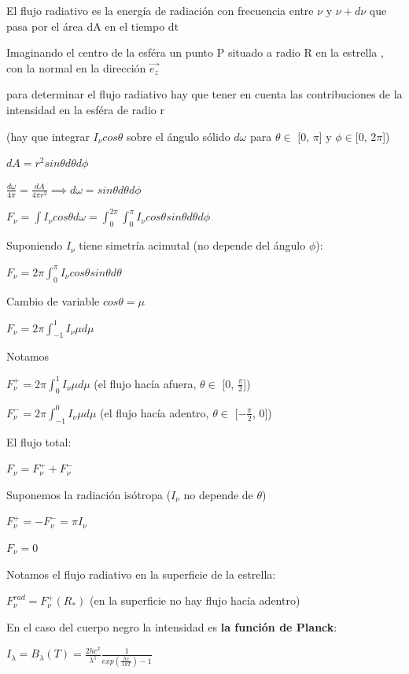 \documentclass[10pt]{book}
\begin{document}
El flujo radiativo es la energía de radiación  con frecuencia entre $\nu$ y $\nu + d\nu$ que pasa por el área dA en el tiempo dt

Imaginando el centro de la esféra un punto P situado a radio R en la estrella , con la normal en la dirección $\vec{e_z}$

para determinar el flujo radiativo hay que tener en cuenta  las contribuciones de la intensidad en la esféra de radio r   

(hay que integrar $I_{\nu} cos \theta $ sobre el ángulo sólido $d\omega $ para $\theta \in$ [0, $\pi$] y $\phi \in $[0, 2$\pi$])

$dA = r^2 sin \theta d\theta d\phi $

$\frac{d\omega}{4\pi} = \frac{dA}{4 \pi r^2}  \implies d\omega = sin \theta d\theta d\phi$


$F_{\nu} = \int{I_{\nu}cos \theta d\omega} = \int_0^{2 \pi}{\int_{0}^{\pi}{I_{\nu} cos \theta sin \theta d\theta } d\phi }$

Suponiendo $I_{\nu}$ tiene  simetría acimutal (no depende del ángulo $\phi$):

$F_{\nu} = 2 \pi \int_0^{\pi}{I_{\nu}cos \theta sin \theta d\theta } $

Cambio de variable $cos \theta = \mu$

$F_{\nu} = 2 \pi \int_{-1}^{1}{I_{\nu} \mu d\mu } $

Notamos 

$F_{\nu}^{+} = 2 \pi \int_{0}^{1}{I_{\nu} \mu d\mu } $  (el flujo hacía afuera, $\theta \in$ [0, $\frac{\pi}{2}$]) 

$F_{\nu}^{-} = 2 \pi \int_{-1}^{0}{I_{\nu} \mu d\mu } $  (el flujo hacía adentro, $\theta \in$ [$-\frac{\pi}{2}$, 0])

El flujo total:

$F_{\nu} = F_{\nu}^{+} + F_{\nu}^{-}$

Suponemos la radiación isótropa ($I_{\nu}$ no depende de $\theta$)

$F_{\nu}^{+} = -F_{\nu}^{-} =   \pi I_{\nu} $

$F_{\nu} = 0$ 

Notamos el flujo radiativo  en la superficie de la estrella:

$F_{\nu}^{rad} = F_{\nu}^{+}(R_{*}) $ (en la superficie no hay flujo hacía adentro)


En el caso del cuerpo negro la intensidad es  \textbf{la función de Planck}:

$I_{\lambda} = B_{\lambda}(T) = \frac{2 h c^2}{\lambda ^5} \frac{1}{exp(\frac{h c}{\lambda k T}) -1 }$  
\end{document}
